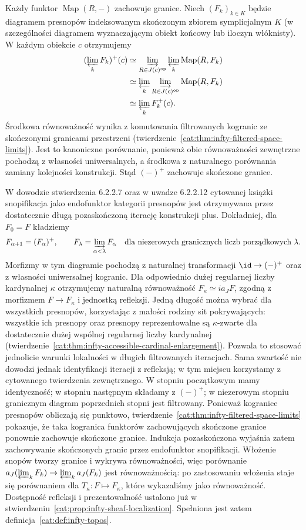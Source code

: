 Każdy funktor $\operatorname{Map}(R,-)$ zachowuje granice. Niech $(F_k)_{k\in K}$ będzie diagramem presnopów indeksowanym skończonym zbiorem symplicjalnym $K$ (w szczególności diagramem wyznaczającym obiekt końcowy lub iloczyn włóknisty). W każdym obiekcie $c$ otrzymujemy
\[
\begin{aligned}
 (\varprojlim_k F_k)^+(c)
 &\simeq\varinjlim_{R\in J(c)^{\mathrm{op}}}
              \varprojlim_k\operatorname{Map}(R,F_k)\\
 &\simeq\varprojlim_k
              \varinjlim_{R\in J(c)^{\mathrm{op}}}\operatorname{Map}(R,F_k)\\
 &\simeq\varprojlim_k F_k^+(c).
\end{aligned}
\]
Środkowa równoważność wynika z komutowania filtrowanych kogranic ze skończonymi granicami przestrzeni (twierdzenie~\ref{cat:thm:infty-filtered-space-limits}). Jest to kanoniczne porównanie, ponieważ obie równoważności zewnętrzne pochodzą z własności uniwersalnych, a środkowa z naturalnego porównania zamiany kolejności konstrukcji. Stąd $(-)^+$ zachowuje skończone granice.

W dowodzie stwierdzenia 6.2.2.7 oraz w uwadze 6.2.2.12 cytowanej książki snopifikacja jako endofunktor kategorii presnopów jest otrzymywana przez dostatecznie długą pozaskończoną iterację konstrukcji plus. Dokładniej, dla $F_0=F$ kładziemy
\[
 F_{\alpha+1}=(F_\alpha)^+,\qquad
 F_\lambda=\varinjlim_{\alpha<\lambda}F_\alpha
 \quad\text{dla niezerowych granicznych liczb porządkowych }\lambda.
\]
Morfizmy w tym diagramie pochodzą z naturalnej transformacji $\id\to(-)^+$ oraz z własności uniwersalnej kogranic. Dla odpowiednio dużej regularnej liczby kardynalnej $\kappa$ otrzymujemy naturalną równoważność $F_\kappa\simeq i a_J F$, zgodną z morfizmem $F\to F_\kappa$ i jednostką refleksji. Jedną długość można wybrać dla wszystkich presnopów, korzystając z małości rodziny sit pokrywających: wszystkie ich presnopy oraz presnopy reprezentowalne są $\kappa$-zwarte dla dostatecznie dużej wspólnej regularnej liczby kardynalnej (twierdzenie~\ref{cat:thm:infty-accessible-cardinal-enlargement}). Pozwala to stosować jednolicie warunki lokalności w długich filtrowanych iteracjach. Sama zwartość nie dowodzi jednak identyfikacji iteracji z refleksją; w tym miejscu korzystamy z cytowanego twierdzenia zewnętrznego. W stopniu początkowym mamy identyczność; w stopniu następnym składamy z $(-)^+$; w niezerowym stopniu granicznym diagram poprzednich stopni jest filtrowany. Ponieważ kogranice presnopów obliczają się punktowo, twierdzenie~\ref{cat:thm:infty-filtered-space-limits} pokazuje, że taka kogranica funktorów zachowujących skończone granice ponownie zachowuje skończone granice. Indukcja pozaskończona wyjaśnia zatem zachowywanie skończonych granic przez endofunktor snopifikacji. Włożenie snopów tworzy granice i wykrywa równoważności, więc porównanie $a_J(\varprojlim_k F_k)\to\varprojlim_k a_J(F_k)$ jest równoważnością: po zastosowaniu włożenia staje się porównaniem dla $T_\kappa:F\mapsto F_\kappa$, które wykazaliśmy jako równoważność. Dostępność refleksji i prezentowalność ustalono już w stwierdzeniu~\ref{cat:prop:infty-sheaf-localization}. Spełniona jest zatem definicja~\ref{cat:def:infty-topos}.

